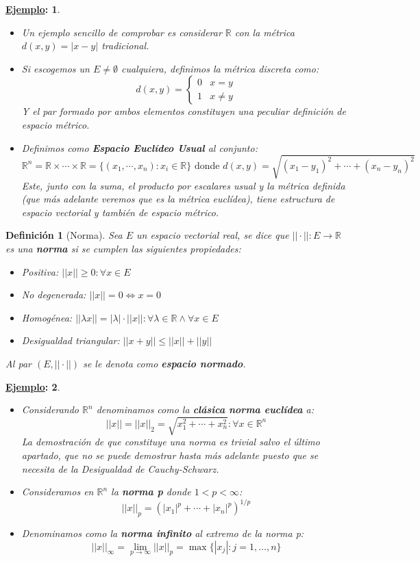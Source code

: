 \documentclass[10pt,a4paper,openright]{book}
\theoremstyle{break}
\newtheorem*{defi}{Definición}
\newtheorem*{ej}{\underline{Ejemplo}:}
\begin{document}
\begin{ej}
\begin{itemize}
\item Un ejemplo sencillo de comprobar es considerar $\mathbb R$ con la métrica $d(x,y) = |x-y|$ tradicional.

\item Si escogemos un $E\neq \emptyset$ cualquiera, definimos la métrica discreta como:
$$d(x,y) = \begin{cases} 0 & x= y \\ 1 & x\neq y \end{cases}$$
Y el par formado por ambos elementos constituyen una peculiar definición de espacio métrico.	

\item Definimos como \textbf{Espacio Euclídeo Usual} al conjunto:
$$\mathbb R ^n = \mathbb R\times \cdots \times \mathbb R = \{(x_1, \cdots, x_n): x_i\in \mathbb R\}\mbox{ donde } d(x,y) = \sqrt{(x_1-y_1)^2+ \cdots + (x_n-y_n)^2}$$
Este, junto con la suma, el producto por escalares usual y la métrica definida (que más adelante veremos que es la métrica euclídea), tiene estructura de espacio vectorial y también de espacio métrico.
\end{itemize}
\end{ej}

\begin{defi}[Norma]
Sea $E$ un espacio vectorial real, se dice que $||\cdot||: E \rightarrow \mathbb R$ es una \textbf{norma} si se cumplen las siguientes propiedades:
\begin{itemize}
\item Positiva: $||x||\geq 0: \forall x \in E$
\item No degenerada: $||x|| = 0 \Leftrightarrow x = 0$
\item Homogénea: $||\lambda x|| = |\lambda| \cdot ||x||: \forall \lambda \in \mathbb R \wedge \forall x \in E$
\item Desigualdad triangular: $||x+y||\leq ||x|| + ||y||$
\end{itemize}
Al par $(E,||\cdot||)$ se le denota como \textbf{espacio normado}.
\end{defi}

\begin{ej}
\begin{itemize}
\item Considerando $\mathbb R^n$ denominamos como la \textbf{clásica norma euclídea} a:
$$||x|| = ||x||_2 = \sqrt{x_1^2+\cdots + x_n^2} : \forall x \in \mathbb R^n $$
La demostración de que constituye una norma es trivial salvo el último apartado, que no se puede demostrar hasta más adelante puesto que se necesita de la \textit{Desigualdad de Cauchy-Schwarz}.
\item Consideramos en $\mathbb R^n$ la \textbf{norma p} donde $1<p<\infty$:
$$||x||_p = \left(|x_1|^p + \cdots + |x_n|^p\right)^{1/p}$$
\item Denominamos como la \textbf{norma infinito} al extremo de la norma p:
$$||x||_\infty = \lim_{p\rightarrow\infty} ||x||_p = \max \{|x_j| : j = 1,\ldots, n\}$$
\end{itemize}
\end{ej}
\end{document}
